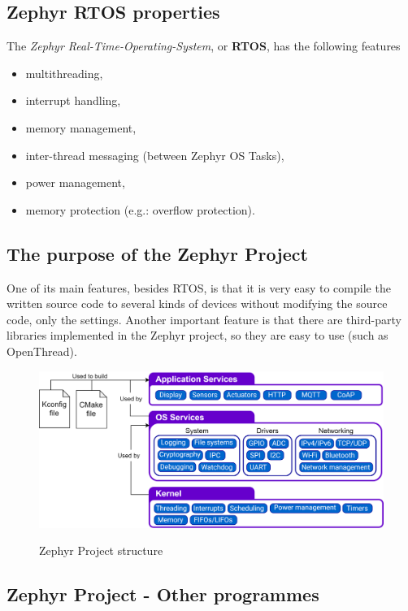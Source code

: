 \subsection{Zephyr RTOS properties}
The \textit{Zephyr Real-Time-Operating-System}, or \textbf{RTOS}, has the following features
\begin{itemize}
    \item multithreading,
    \item interrupt handling,
    \item memory management,
    \item inter-thread messaging (between Zephyr OS Tasks),
    \item power management,
    \item memory protection (e.g.: overflow protection).
\end{itemize}

\subsection{The purpose of the Zephyr Project}
One of its main features, besides RTOS, is that it is very easy to compile the written source code to several kinds of devices without modifying the source code, only the settings. Another important feature is that there are third-party libraries implemented in the Zephyr project, so they are easy to use (such as OpenThread).

\begin{figure}[!htb]
    \centering
    \includegraphics[scale=0.13]{img/Module_organization.png}
    \caption{Zephyr Project structure}
    \label{fig:Zephyrl}
    \cite{Zephyr}
\end{figure}


\subsection{Zephyr Project - Other programmes}

